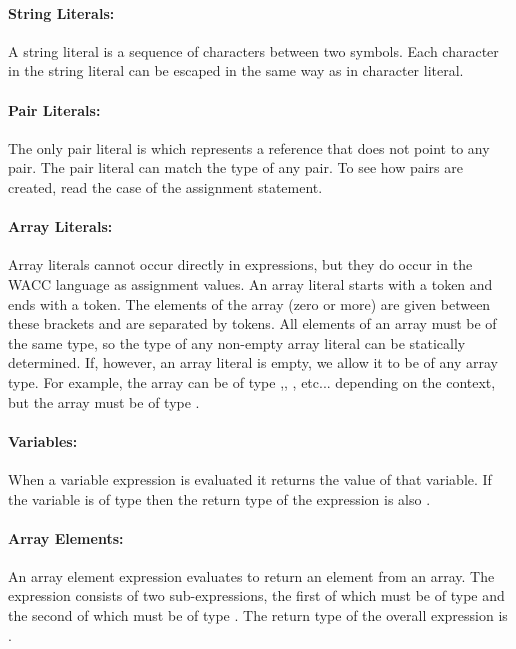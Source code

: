 \documentclass[a4paper]{article}
\theoremstyle{definition}
\begin{document}
\paragraph{String Literals:}
A string literal  is a sequence of characters between two  symbols. 
Each character in the string literal can be escaped in the same way as in character literal.

\paragraph{Pair Literals:}
The only pair literal  is  which represents a reference that does not point to any pair. The  pair literal can match the type of any pair.
To see how pairs are created, read the  case of the assignment statement.

\paragraph{Array Literals:} Array literals cannot occur directly in expressions, but they do occur in the WACC language as assignment values.
An array literal starts with a \lit{[} token and ends with a \lit{]} token. 
The elements of the array (zero or more) are given between these brackets and are separated by \lit{,} tokens. 
All elements of an array must be of the same type, so the type of any non-empty array literal can be statically determined.
If, however, an array literal is empty, we allow it to be of any array type.
For example, the array \lit{[]} can be of type ,, , etc... depending on the context, but the array \lit{[1]} must be of type .

\paragraph{Variables:}
When a variable expression  is evaluated it returns the value of that variable. 
If the variable is of type  then the return type of the expression is also .

\paragraph{Array Elements:}
An array element expression evaluates to return an element from an array.
The expression consists of two sub-expressions, the first of which must be of type  and the second of which must be of type .
The return type of the overall expression is .
\end{document}
